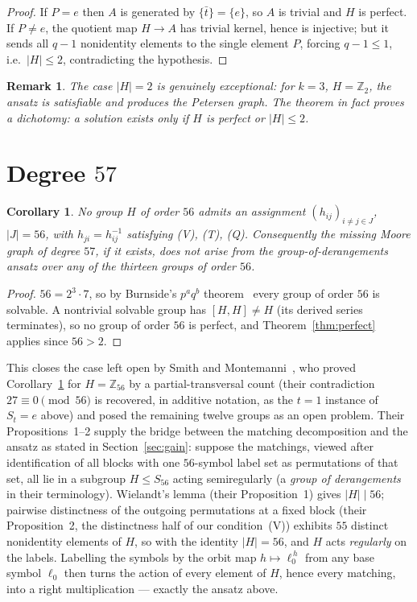 \documentclass[10pt]{article}
\newtheorem{corollary}[theorem]{Corollary}
\newtheorem{remark}[theorem]{Remark}
\newcommand{\id}{e}
\begin{document}
\begin{proof}
If $P=\id$ then $A$ is generated by $\{\bar t\}=\{\id\}$, so $A$ is
trivial and $H$ is perfect. If $P\neq\id$, the quotient map
$H\to A$ has trivial kernel, hence is injective; but it sends all
$q-1$ nonidentity elements to the single element $P$, forcing
$q-1\le 1$, i.e.\ $|H|\le 2$, contradicting the hypothesis.
\end{proof}

\begin{remark}
The case $|H|=2$ is genuinely exceptional: for $k=3$, $H=\mathbb{Z}_2$,
the ansatz is satisfiable and produces the Petersen graph. The theorem
in fact proves a dichotomy: a solution exists only if $H$ is perfect or
$|H|\le 2$.
\end{remark}

\section{Degree \texorpdfstring{$57$}{57}}

\begin{corollary}\label{cor:57}
No group $H$ of order $56$ admits an assignment
$(h_{ij})_{i\ne j\in J}$, $|J|=56$, with $h_{ji}=h_{ij}^{-1}$
satisfying \textup{(V)}, \textup{(T)}, \textup{(Q)}. Consequently the missing
Moore graph of degree $57$, if it exists, does not arise from the
group-of-derangements ansatz over any of the thirteen groups of order
$56$.
\end{corollary}

\begin{proof}
$56=2^3\cdot 7$, so by Burnside's $p^aq^b$
theorem~\cite{Burnside1904} every group of order $56$ is solvable. A
nontrivial solvable group has $[H,H]\ne H$ (its derived series
terminates), so no group of order $56$ is perfect, and
Theorem~\ref{thm:perfect} applies since $56>2$.
\end{proof}

This closes the case left open by Smith and Montemanni~\cite{SM2026},
who proved Corollary~\ref{cor:57} for $H=\mathbb{Z}_{56}$ by a
partial-transversal count (their contradiction $27\equiv 0
\pmod{56}$ is recovered, in additive notation, as the $t=1$ instance
of $S_t=\id$ above) and posed the remaining twelve groups as an open
problem. Their Propositions~1--2 supply the bridge between the matching
decomposition and the ansatz as stated in Section~\ref{sec:gain}:
suppose the matchings, viewed after identification of all blocks with
one $56$-symbol label set as permutations of that set, all lie in a
subgroup $H\le S_{56}$ acting semiregularly (a \emph{group of
derangements} in their terminology). Wielandt's lemma (their
Proposition~1) gives $|H|\mid 56$; pairwise distinctness of the
outgoing permutations at a fixed block (their Proposition~2, the
distinctness half of our condition~(V)) exhibits $55$ distinct
nonidentity elements of $H$, so with the identity $|H|=56$, and $H$
acts \emph{regularly} on the labels. Labelling the symbols by the orbit
map $h\mapsto \ell_0^{\,h}$ from any base symbol $\ell_0$ then turns
the action of every element of $H$, hence every matching, into a right
multiplication --- exactly the ansatz above.
\end{document}
